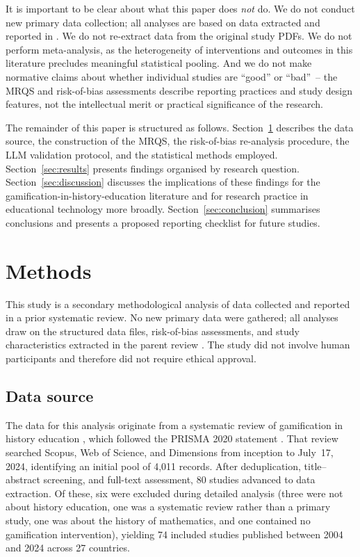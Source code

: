 \documentclass[etq]{acnsart}
\begin{document}
	It is important to be clear about what this paper does \emph{not} do. We do not conduct new primary data collection; all analyses are based on data extracted and reported in \citet{KorniienkoSemerikov2024}. We do not re-extract data from the original study PDFs. We do not perform meta-analysis, as the heterogeneity of interventions and outcomes in this literature precludes meaningful statistical pooling. And we do not make normative claims about whether individual studies are ``good'' or ``bad''~-- the MRQS and risk-of-bias assessments describe reporting practices and study design features, not the intellectual merit or practical significance of the research.
	
	The remainder of this paper is structured as follows. Section~\ref{sec:methods} describes the data source, the construction of the MRQS, the risk-of-bias re-analysis procedure, the LLM validation protocol, and the statistical methods employed. Section~\ref{sec:results} presents findings organised by research question. Section~\ref{sec:discussion} discusses the implications of these findings for the gamification-in-history-education literature and for research practice in educational technology more broadly. Section~\ref{sec:conclusion} summarises conclusions and presents a proposed reporting checklist for future studies.
	
	
	
	\section{Methods}
	\label{sec:methods}
	
	This study is a secondary methodological analysis of data collected and reported in a prior systematic review. No new primary data were gathered; all analyses draw on the structured data files, risk-of-bias assessments, and study characteristics extracted in the parent review \cite{KorniienkoSemerikov2024}. The study did not involve human participants and therefore did not require ethical approval.
	
	\subsection{Data source}
	\label{sec:methods_datasource}
	
	The data for this analysis originate from a systematic review of gamification in history education \cite{KorniienkoSemerikov2024}, which followed the PRISMA 2020 statement \cite{Page2021}. That review searched Scopus, Web of Science, and Dimensions from inception to July~17, 2024, identifying an initial pool of 4,011 records. After deduplication, title--abstract screening, and full-text assessment, 80 studies advanced to data extraction. Of these, six were excluded during detailed analysis (three were not about history education, one was a systematic review rather than a primary study, one was about the history of mathematics, and one contained no gamification intervention), yielding 74 included studies published between 2004 and 2024 across 27 countries.
	
\end{document}
